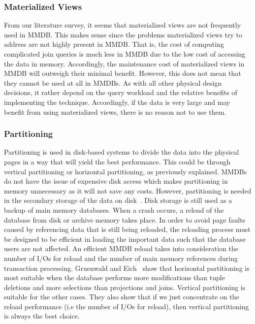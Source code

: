 \documentclass[12pt,a4paper]{article}
\begin{document}
\subsubsection{Materialized Views}
From our literature survey, it seems that materialized views are not frequently used in MMDB. This makes sense since the problems materialized views try to
address are not highly present in MMDB. That is, the cost of computing complicated join queries is much less in MMDB due to the low cost of accessing
the data in memory. Accordingly, the maintenance cost of materialized views in MMDB will outweigh their minimal benefit. However, this does not mean that they
cannot be used at all in MMDBs. As with all other physical design decisions, it rather depend on the query workload and the relative benefits of implementing
the technique. Accordingly, if the data is very large and may benefit from using materialized views, there is no reason not to use them.

\subsubsection{Partitioning}

Partitioning is used in disk-based systems to divide the data into the physical pages in a way that will yield the best performance. This could be through
vertical partitioning or horizontal partitioning, as previously explained. MMDBs do not have the issue of expensive disk access which
makes partitioning in memory unnecessary as it will not save any costs. However, partitioning is needed in the secondary storage of the data on
disk~\cite{gruenwald1990database}. Disk storage is still used as a backup of main memory databases. When a crash occurs, a reload of the database from disk or
archive memory takes place. In order to avoid page faults caused by referencing data that is still being reloaded, the reloading process must be designed to be
efficient in loading the important data such that the database users are not affected. An efficient MMDB reload takes into consideration the number of I/Os for
reload and the number of main memory references during transaction processing. Gruenwald and Eich~\cite{gruenwald1990database,gruenwald1990choosing} show that
horizontal partitioning is most suitable when the database performs more modifications than tuple deletions and more selections than projections and joins.
Vertical partitioning is suitable for the other cases. They also show that if we just concentrate on the reload performance (i.e the number of I/Os for
reload), then vertical partitioning is always the best choice. 
\end{document}
